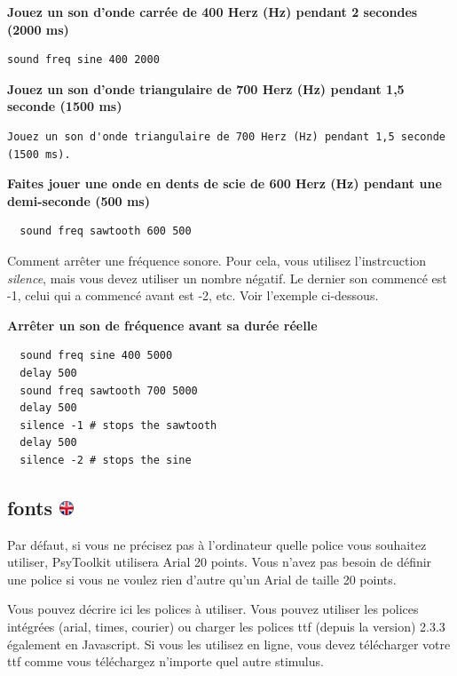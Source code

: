 \documentclass[
]{book}
\begin{document}
\textbf{Jouez un son d'onde carrée de 400 Herz (Hz) pendant 2 secondes (2000 ms)}

\begin{verbatim}
sound freq sine 400 2000
\end{verbatim}

\textbf{Jouez un son d'onde triangulaire de 700 Herz (Hz) pendant 1,5 seconde (1500 ms)}

\begin{verbatim}
Jouez un son d'onde triangulaire de 700 Herz (Hz) pendant 1,5 seconde (1500 ms).
\end{verbatim}

\textbf{Faites jouer une onde en dents de scie de 600 Herz (Hz) pendant une demi-seconde (500 ms)}

\begin{verbatim}
  sound freq sawtooth 600 500
\end{verbatim}

Comment arrêter une fréquence sonore. Pour cela, vous utilisez l'instrcuction \emph{silence}, mais vous devez utiliser un nombre négatif. Le dernier son commencé est -1, celui qui a commencé avant est -2, etc. Voir l'exemple ci-dessous.

\textbf{Arrêter un son de fréquence avant sa durée réelle}

\begin{verbatim}
  sound freq sine 400 5000
  delay 500
  sound freq sawtooth 700 5000
  delay 500
  silence -1 # stops the sawtooth
  delay 500
  silence -2 # stops the sine
\end{verbatim}

\hypertarget{fonts}{%
\subsection[fonts ]{\texorpdfstring{fonts \href{https://www.psytoolkit.org/doc3.4.0/syntax.html\#fonts}{\protect\includegraphics{img/ukflag.png}}}{fonts }}\label{fonts}}

Par défaut, si vous ne précisez pas à l'ordinateur quelle police vous souhaitez utiliser, PsyToolkit utilisera Arial 20 points. Vous n'avez pas besoin de définir une police si vous ne voulez rien d'autre qu'un Arial de taille 20 points.

Vous pouvez décrire ici les polices à utiliser. Vous pouvez utiliser les polices intégrées (arial, times, courier) ou charger les polices ttf (depuis la version) 2.3.3 également en Javascript. Si vous les utilisez en ligne, vous devez télécharger votre ttf comme vous téléchargez n'importe quel autre stimulus.
\end{document}
